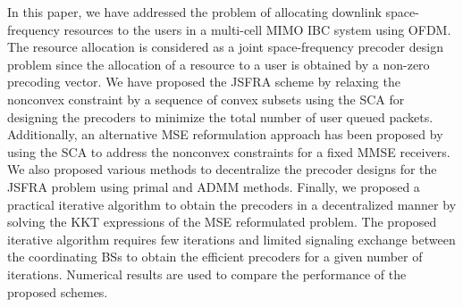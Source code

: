 In this paper, we have addressed the problem of allocating downlink space-frequency resources to the users in a multi-cell \ac{MIMO} \ac{IBC} system using \ac{OFDM}. The resource allocation is considered as a joint space-frequency precoder design problem since the allocation of a resource to a user is obtained by a non-zero precoding vector. We have proposed the \ac{JSFRA} scheme by relaxing the nonconvex constraint by a sequence of convex subsets using the \ac{SCA} for designing the precoders to minimize the total number of user queued packets. Additionally, an alternative \ac{MSE} reformulation approach has been proposed by using the \ac{SCA} to address the nonconvex constraints for a fixed \ac{MMSE} receivers. We also proposed various methods to decentralize the precoder designs for the \ac{JSFRA} problem using primal and \ac{ADMM} methods. Finally, we proposed a practical iterative algorithm to obtain the precoders in a decentralized manner by solving the \ac{KKT} expressions of the \ac{MSE} reformulated problem. The proposed iterative algorithm requires few iterations and limited signaling exchange between the coordinating \acp{BS} to obtain the efficient precoders for a given number of iterations. Numerical results are used to compare the performance of the proposed schemes.